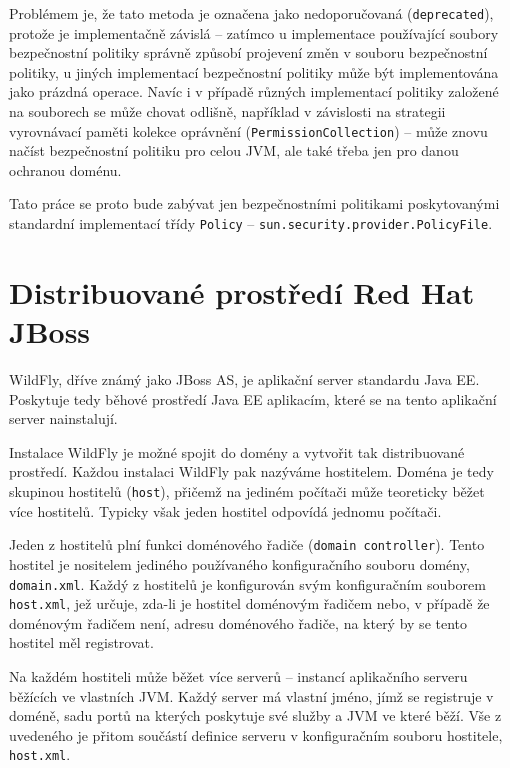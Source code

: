 Problémem je, že tato metoda je označena jako nedoporučovaná ({\tt deprecated}), protože je implementačně závislá -- zatímco u implementace používající soubory bezpečnostní politiky správně způsobí projevení změn v souboru bezpečnostní politiky, u jiných implementací bezpečnostní politiky může být implementována jako prázdná operace. Navíc i v případě různých implementací politiky založené na souborech se může chovat odlišně, například v závislosti na strategii vyrovnávací paměti kolekce oprávnění ({\tt PermissionCollection}) -- může znovu načíst bezpečnostní politiku pro celou JVM, ale také třeba jen pro danou ochranou doménu. \cite{refPolicy}

Tato práce se proto bude zabývat jen bezpečnostními politikami poskytovanými standardní implementací třídy {\tt Policy} -- {\tt sun.security.provider.PolicyFile}.

\chapter{Distribuované prostředí Red Hat JBoss}

WildFly, dříve známý jako JBoss AS, je aplikační server standardu Java EE. Poskytuje tedy běhové prostředí Java EE aplikacím, které se na tento aplikační server nainstalují.

Instalace WildFly je možné spojit do domény a vytvořit tak distribuované prostředí. Každou instalaci WildFly pak nazýváme hostitelem. Doména je tedy skupinou hostitelů ({\tt host}), přičemž na jediném počítači může teoreticky běžet více hostitelů. Typicky však jeden hostitel odpovídá jednomu počítači.

Jeden z hostitelů plní funkci doménového řadiče ({\tt domain controller}). Tento hostitel je nositelem jediného používaného konfiguračního souboru domény, {\tt domain.xml}. Každý z hostitelů je konfigurován svým konfiguračním souborem {\tt host.xml}, jež určuje, zda-li je hostitel doménovým řadičem nebo, v případě že doménovým řadičem není, adresu doménového řadiče, na který by se tento hostitel měl registrovat. \cite{jbossDomainSetup}

Na každém hostiteli může běžet více serverů -- instancí aplikačního serveru běžících ve vlastních JVM. Každý server má vlastní jméno, jímž se registruje v doméně, sadu portů na kterých poskytuje své služby a JVM ve které běží. Vše z uvedeného je přitom součástí definice serveru v konfiguračním souboru hostitele, {\tt host.xml}. \cite{jbossDomainSetup}

